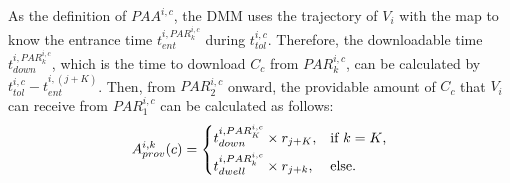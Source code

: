 \documentclass{ieeeaccess}
\begin{document}
As the definition of $PAA^{i,c}$, the DMM uses the trajectory of $V_{i}$ with the map to know the entrance time $t_{ent}^{i, PAR^{i,c}_{k}}$ during $t_{tol}^{i,c}$.
Therefore, the downloadable time $t_{down}^{i, PAR^{i,c}_{k}}$, which is the time to download $C_{c}$ from $PAR^{i,c}_{k}$, can be calculated by $t_{tol}^{i,c}-t_{ent}^{i, (j+K)}$.
Then, from $PAR^{i,c}_{2}$ onward, the providable amount of $C_{c}$ that $V_{i}$ can receive from ${PAR^{i,c}_{1}}$ can be calculated as follows:
\begin{equation}
    A_{prov}^{i, k}(c) = \begin{cases*}
        t_{down}^{i, PAR^{i,c}_{K}} \times r_{j+K}, & if $k=K$,\\
        t_{dwell}^{i, PAR^{i,c}_{k}} \times r_{j+k}, & else.\\
    \end{cases*} \label{eq:c}
\end{equation}
\end{document}
